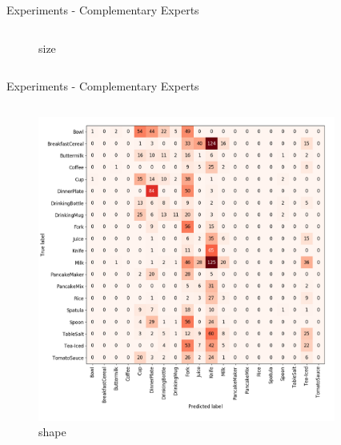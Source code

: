 \documentclass[]{beamer}
\begin{document}
\begin{frame}{Experiments - Complementary Experts}
\begin{columns}
\begin{column}{0.5\textwidth}
\begin{figure}
			\caption{size}
		\end{figure}
	\end{column}
\end{columns}
\end{frame}

\begin{frame}{Experiments - Complementary Experts}
\begin{columns}
	\begin{column}{0.5\textwidth}
		\begin{figure}
			\includegraphics[scale=.2]{../thesis/img/chapter6/UnrealGTClass_shape.png}
			\caption{shape}
		\end{figure}	
	\end{column}
	\quad
	\begin{column}{0.5\textwidth}
		\begin{figure}

\end{figure}
\end{column}
\end{columns}
\end{frame}
\end{document}
